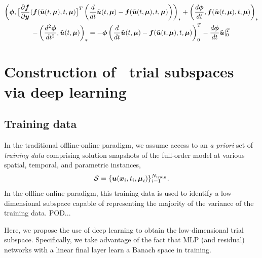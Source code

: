 \documentclass[3p,computermodern,10pt]{elsarticle}
\begin{document}
 \begin{multline}\label{eq:ROM_normal2}
\left(  \boldsymbol \phi,  \big[\frac{\partial \boldsymbol f}{\partial \boldsymbol y}(  \boldsymbol f(\tilde{\boldsymbol u}(t,\boldsymbol \mu),t,\boldsymbol \mu)  \big]^T  \left( \frac{d}{dt} \tilde{\boldsymbol u}(t,\boldsymbol \mu)  -   \boldsymbol f(\tilde{\boldsymbol u}(t,\boldsymbol \mu),t,\boldsymbol \mu) \right) \right)_{*} 
+ \left( \frac{d \boldsymbol \phi}{dt},    \boldsymbol f(\tilde{\boldsymbol u}(t,\boldsymbol \mu),t,\boldsymbol \mu)   \right)_{*} \\
- \left( \frac{d^2 \boldsymbol \phi}{dt^2},   \tilde{\boldsymbol u}(t,\boldsymbol \mu) \right)_{*} 
 =  
-  \boldsymbol \phi \left( \frac{d}{dt} \tilde{\boldsymbol u}(t,\boldsymbol \mu)   - \boldsymbol f(\tilde{\boldsymbol u}(t,\boldsymbol \mu),t,\boldsymbol \mu) \right)_0^T - \frac{d \boldsymbol \phi}{dt}\tilde{\boldsymbol u}|_0^T
\end{multline} 


\section{Construction of \parametricSpaceTimeAcronym\ trial subspaces via deep learning}
\subsection{Training data}
In the traditional offline-online paradigm, we assume access to an \textit{a priori} set of \textit{training data} comprising solution snapshots of the full-order model at various spatial, temporal, and parametric instances,
$$\mathcal{S} = \{\boldsymbol u(\boldsymbol x_i,t_i,\boldsymbol \mu_i) \}_{i=1}^{N_{\text{train}}}.$$ 
In the offline-online paradigm, this training data is used to identify a low-dimensional subspace capable of representing the majority of the variance of the training data. POD...

Here, we propose the use of deep learning to obtain the low-dimensional trial subspace. Specifically, we take advantage of the fact that MLP (and residual) networks with a linear final layer learn a Banach space in training. 
\end{document}
